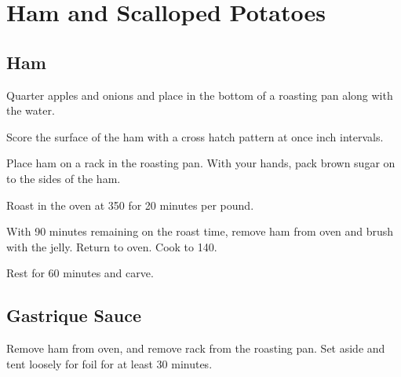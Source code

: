 
\section{Ham and Scalloped Potatoes}
\begin{recipe}


\subsection{Ham}



Quarter apples and onions and place in the bottom of a roasting pan along with the water.

Score the surface of the ham with a cross hatch pattern at once inch intervals.

Place ham on a rack in the roasting pan. With your hands, pack brown sugar on to the sides of the ham.

Roast in the oven at 350\degree{} for 20 minutes per pound.


With 90 minutes remaining on the roast time, remove ham from oven and brush with the jelly. Return to oven. Cook to 140\degree{}. 

Rest for 60 minutes and carve. 

\subsection{Gastrique Sauce}


Remove ham from oven, and remove rack from the roasting pan. Set aside and tent loosely for foil for at least 30 minutes.


\end{recipe}
